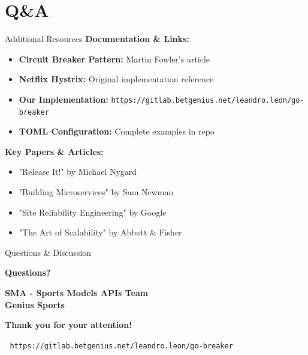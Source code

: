 \documentclass[aspectratio=169]{beamer}
\begin{document}
\section{Q\&A}


\begin{frame}{Additional Resources}
    \textbf{Documentation \& Links:}
    \begin{itemize}
        \item \textbf{Circuit Breaker Pattern:} Martin Fowler's article
        \item \textbf{Netflix Hystrix:} Original implementation reference
        \item \textbf{Our Implementation:} \texttt{https://gitlab.betgenius.net/leandro.leon/go-breaker}
        \item \textbf{TOML Configuration:} Complete examples in repo
    \end{itemize}
    
    \vspace{0.5cm}
    \textbf{Key Papers \& Articles:}
    \begin{itemize}
        \item "Release It!" by Michael Nygard
        \item "Building Microservices" by Sam Newman
        \item "Site Reliability Engineering" by Google
        \item "The Art of Scalability" by Abbott \& Fisher
    \end{itemize}
    
\end{frame}

\begin{frame}{Questions \& Discussion}
    \begin{center}
        \Huge \textbf{Questions?}
        
        \vspace{1cm}
        
        \Large
        \textbf{SMA - Sports Models APIs Team}\\
        \textbf{Genius Sports}
        
        \vspace{0.5cm}
        
        
        \vspace{0.5cm}
        
        \textbf{Thank you for your attention!}
        
        \vspace{0.3cm}
        
        \normalsize
        🔗 \texttt{https://gitlab.betgenius.net/leandro.leon/go-breaker}
    \end{center}
\end{frame}
\end{document}
